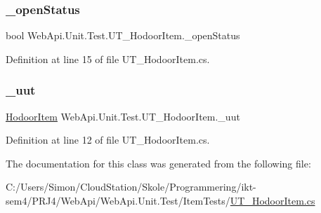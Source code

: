 \subsubsection{\texorpdfstring{\+\_\+open\+Status}{\_openStatus}}
{\footnotesize\ttfamily bool Web\+Api.\+Unit.\+Test.\+U\+T\+\_\+\+Hodoor\+Item.\+\_\+open\+Status\hspace{0.3cm}{\ttfamily [private]}}



Definition at line 15 of file U\+T\+\_\+\+Hodoor\+Item.\+cs.

\mbox{\label{class_web_api_1_1_unit_1_1_test_1_1_u_t___hodoor_item_a539119e2000d67342a2dda9e0be5e146}} 
\subsubsection{\texorpdfstring{\+\_\+uut}{\_uut}}
{\footnotesize\ttfamily \mbox{\hyperlink{class_f_w_p_s_1_1_models_1_1_hodoor_item}{Hodoor\+Item}} Web\+Api.\+Unit.\+Test.\+U\+T\+\_\+\+Hodoor\+Item.\+\_\+uut\hspace{0.3cm}{\ttfamily [private]}}



Definition at line 12 of file U\+T\+\_\+\+Hodoor\+Item.\+cs.



The documentation for this class was generated from the following file\+:\begin{DoxyCompactItemize}
\item 
C\+:/\+Users/\+Simon/\+Cloud\+Station/\+Skole/\+Programmering/ikt-\/sem4/\+P\+R\+J4/\+Web\+Api/\+Web\+Api.\+Unit.\+Test/\+Item\+Tests/\mbox{\hyperlink{_u_t___hodoor_item_8cs}{U\+T\+\_\+\+Hodoor\+Item.\+cs}}\end{DoxyCompactItemize}
